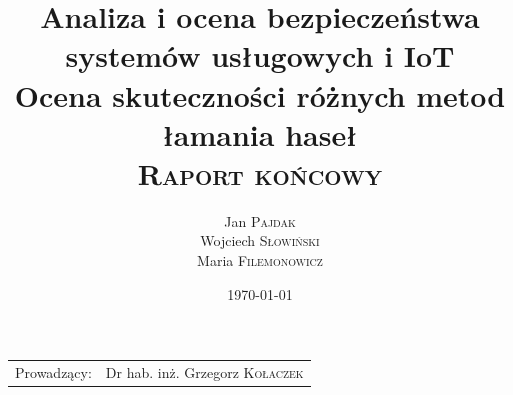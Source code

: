 \documentclass{article}
\title{Analiza i ocena bezpieczeństwa systemów usługowych i IoT \\ Ocena skuteczności różnych metod łamania haseł \\ \textsc{Raport końcowy}}
\author{Jan \textsc{Pajdak} \\ Wojciech \textsc{Słowiński} \\ Maria \textsc{Filemonowicz}}
\date{\today}
\begin{document}
	
	\maketitle
	\begin{center}
		\begin{tabular}{l r}
			Prowadzący: &  Dr hab. inż. Grzegorz \textsc{Kołaczek}
		\end{tabular}
	\end{center}
	
	\newpage
	\tableofcontents
	
	
	
	
	
	
	
	
	\newpage
\end{document}
